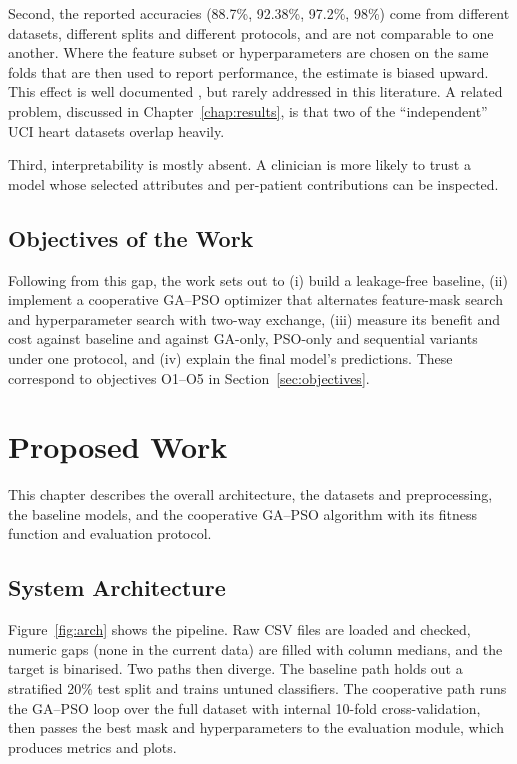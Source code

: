 \documentclass[MTech]{ugthesis}
\begin{document}
Second, the reported accuracies (88.7\%, 92.38\%, 97.2\%, 98\%) come from different datasets, different splits and different protocols, and are not comparable to one another. Where the feature subset or hyperparameters are chosen on the same folds that are then used to report performance, the estimate is biased upward. This effect is well documented \citep{varma2006bias,cawley2010overfitting}, but rarely addressed in this literature. A related problem, discussed in Chapter~\ref{chap:results}, is that two of the ``independent'' UCI heart datasets overlap heavily.

Third, interpretability is mostly absent. A clinician is more likely to trust a model whose selected attributes and per-patient contributions can be inspected.

\section{Objectives of the Work}
Following from this gap, the work sets out to (i) build a leakage-free baseline, (ii) implement a cooperative GA--PSO optimizer that alternates feature-mask search and hyperparameter search with two-way exchange, (iii) measure its benefit and cost against baseline and against GA-only, PSO-only and sequential variants under one protocol, and (iv) explain the final model's predictions. These correspond to objectives O1--O5 in Section~\ref{sec:objectives}.

\chapter{Proposed Work}
\label{chap:proposed}

This chapter describes the overall architecture, the datasets and preprocessing, the baseline models, and the cooperative GA--PSO algorithm with its fitness function and evaluation protocol.

\section{System Architecture}
Figure~\ref{fig:arch} shows the pipeline. Raw CSV files are loaded and checked, numeric gaps (none in the current data) are filled with column medians, and the target is binarised. Two paths then diverge. The baseline path holds out a stratified 20\% test split and trains untuned classifiers. The cooperative path runs the GA--PSO loop over the full dataset with internal 10-fold cross-validation, then passes the best mask and hyperparameters to the evaluation module, which produces metrics and plots.
\end{document}
